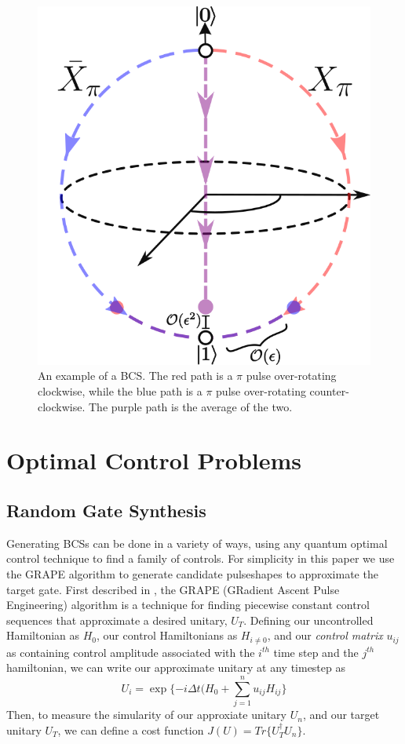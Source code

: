 \documentclass[aps,nofootinbib,pra,notitlepage,twocolumn]{revtex4-1}
\begin{document}
\begin{figure}
  \centering
  \includegraphics[width=.75\columnwidth]{simple_example.png}
  \caption{An example of a BCS. The red path is a $\pi$ pulse over-rotating clockwise, while the blue path is a $\pi$ pulse over-rotating counter-clockwise. The purple path is the average of the two.}
  \label{fig:simple_example}
\end{figure}
\section{Optimal Control Problems}\label{ocp}
\subsection{Random Gate Synthesis}
Generating BCSs can be done in a variety of ways, using any quantum optimal control technique \cite{Caneva2011, Machnes2018} to find a family of controls. For simplicity in this paper we use the GRAPE algorithm to generate candidate pulseshapes to approximate the target gate. First described in \cite{Khaneja2005}, the GRAPE (GRadient Ascent Pulse Engineering) algorithm is a technique for finding piecewise constant control sequences that approximate a desired unitary, $U_T$. Defining our uncontrolled Hamiltonian as $H_0$, our control Hamiltonians as $H_{i\neq 0}$, and our \textit{control matrix} $u_{ij}$ as containing control amplitude associated with the $i^{th}$ time step and the $j^{th}$ hamiltonian, we can write our approximate unitary at any timestep as
\begin{equation}\label{eq:3}
  U_i = \exp\{-i\Delta t(H_0 + \sum_{j=1}^{n}u_{ij}H_{ij}\}
\end{equation}
Then, to measure the simularity of our approxiate unitary $U_n$, and our target unitary $U_T$, we can define a cost function $J(U) = Tr\{U_T^{\dagger}U_n\}$.
\end{document}
